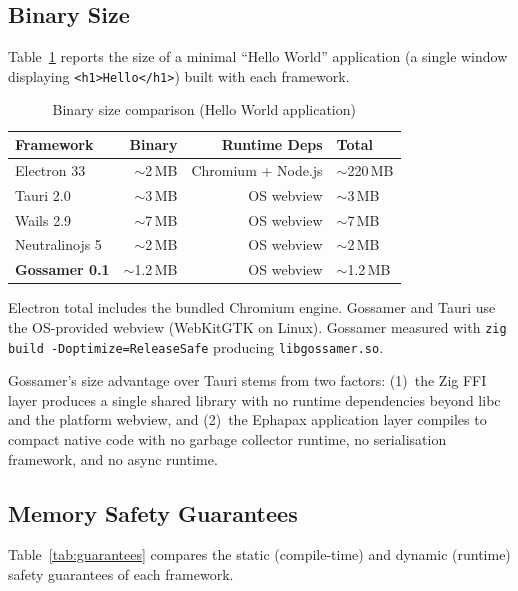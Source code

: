 \documentclass[11pt,a4paper]{article}
\theoremstyle{definition}
\begin{document}
\subsection{Binary Size}

Table~\ref{tab:binary} reports the size of a minimal ``Hello World''
application (a single window displaying \texttt{<h1>Hello</h1>})
built with each framework.

\begin{table}[ht]
\centering
\caption{Binary size comparison (Hello World application)}
\label{tab:binary}
\small
\begin{tabular}{@{}lrrl@{}}
\toprule
\textbf{Framework} & \textbf{Binary} & \textbf{Runtime Deps} & \textbf{Total} \\
\midrule
Electron 33      & $\sim$2\,MB    & Chromium + Node.js & $\sim$220\,MB \\
Tauri 2.0        & $\sim$3\,MB    & OS webview         & $\sim$3\,MB \\
Wails 2.9        & $\sim$7\,MB    & OS webview         & $\sim$7\,MB \\
Neutralinojs 5   & $\sim$2\,MB    & OS webview         & $\sim$2\,MB \\
\textbf{Gossamer 0.1} & $\sim$1.2\,MB & OS webview     & $\sim$1.2\,MB \\
\bottomrule
\end{tabular}
\par\smallskip
{\footnotesize Electron total includes the bundled Chromium engine.
Gossamer and Tauri use the OS-provided webview (WebKitGTK on Linux).
Gossamer measured with \texttt{zig build -Doptimize=ReleaseSafe}
producing \texttt{libgossamer.so}.}
\end{table}

Gossamer's size advantage over Tauri stems from two factors:
(1)~the Zig FFI layer produces a single shared library with no
runtime dependencies beyond libc and the platform webview, and
(2)~the Ephapax application layer compiles to compact native code
with no garbage collector runtime, no serialisation framework, and
no async runtime.

\subsection{Memory Safety Guarantees}

Table~\ref{tab:guarantees} compares the static (compile-time) and
dynamic (runtime) safety guarantees of each framework.
\end{document}
